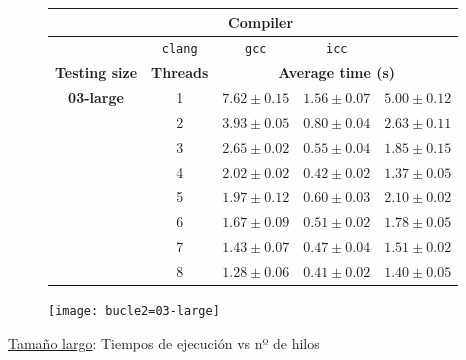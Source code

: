 \begin{figure}[H]
    \centering
    \begin{subfigure}{0.4\textwidth}
        \begin{adjustbox}{width=\textwidth} 
        \begin{tabular}{|c|c|c|c|c|}
            \hline
            \rowcolor{azul} \multicolumn{2}{|c|}{}&\multicolumn{3}{c|}{\textbf{Compiler}} \\ \hline
            \rowcolor{azul} \multicolumn{2}{|c|}{}&\texttt{clang}&\texttt{gcc}&\texttt{icc}\\ \hline
            \rowcolor{azul} \textbf{Testing size} & \textbf{Threads}&\multicolumn{3}{c|}{\textbf{Average time (s)}} \\ \hline
            \multirow{8}{1cm}{\textbf{03-large}} & 1 & \(7.62\pm{0.15}\) & \(1.56\pm{0.07}\) & \(5.00\pm{0.12}\) \\ \cline{2-5}
            & 2 & \(3.93\pm{0.05}\) & \(0.80\pm{0.04}\) & \(2.63\pm{0.11}\) \\ \cline{2-5}
            & 3 & \(2.65\pm{0.02}\) & \(0.55\pm{0.04}\) & \(1.85\pm{0.15}\) \\ \cline{2-5}
            & 4 & \(2.02\pm{0.02}\) & \(0.42\pm{0.02}\) & \(1.37\pm{0.05}\) \\ \cline{2-5}
            & 5 & \(1.97\pm{0.12}\) & \(0.60\pm{0.03}\) & \(2.10\pm{0.02}\) \\ \cline{2-5}
            & 6 & \(1.67\pm{0.09}\) & \(0.51\pm{0.02}\) & \(1.78\pm{0.05}\) \\ \cline{2-5}
            & 7 & \(1.43\pm{0.07}\) & \(0.47\pm{0.04}\) & \(1.51\pm{0.02}\) \\ \cline{2-5}
            & 8 & \(1.28\pm{0.06}\) & \(0.41\pm{0.02}\) & \(1.40\pm{0.05}\) \\ \hline
        \end{tabular}
        \end{adjustbox}
    \end{subfigure}
    \hfill
    \begin{subfigure}{0.5\textwidth}
        \texttt{[image: bucle2=03-large]}
    \end{subfigure}
    \caption{\underline{Tamaño largo}: Tiempos de ejecución vs nº de hilos}
    \label{bucle2=03-large}
\end{figure}